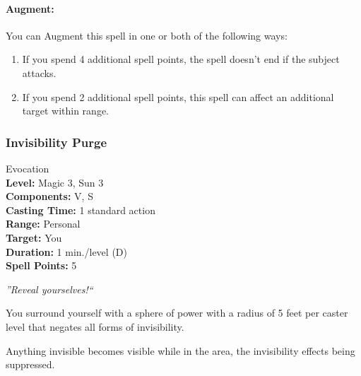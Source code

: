 \paragraph{Augment:} You can Augment this spell in one or both of the following ways:
\begin{enumerate}
 \item If you spend 4 additional spell points, the spell doesn't end if the subject attacks.
 \item If you spend 2 additional spell points, this spell can affect an additional target within range.
\end{enumerate}
\subsubsection{Invisibility Purge}
\label{Spell:InvisibilityPurge}
Evocation
\\ \textbf{Level:} Magic 3, Sun 3
\\ \textbf{Components:} V, S
\\ \textbf{Casting Time:} 1 standard action
\\ \textbf{Range:} Personal
\\ \textbf{Target:} You
\\ \textbf{Duration:} 1 min./level (D)
\\ \textbf{Spell Points:} 5

\emph{''Reveal yourselves!``}

You surround yourself with a sphere of power with a radius of 5 feet per caster level that negates all forms of invisibility.

Anything invisible becomes visible while in the area, the invisibility effects being suppressed.

